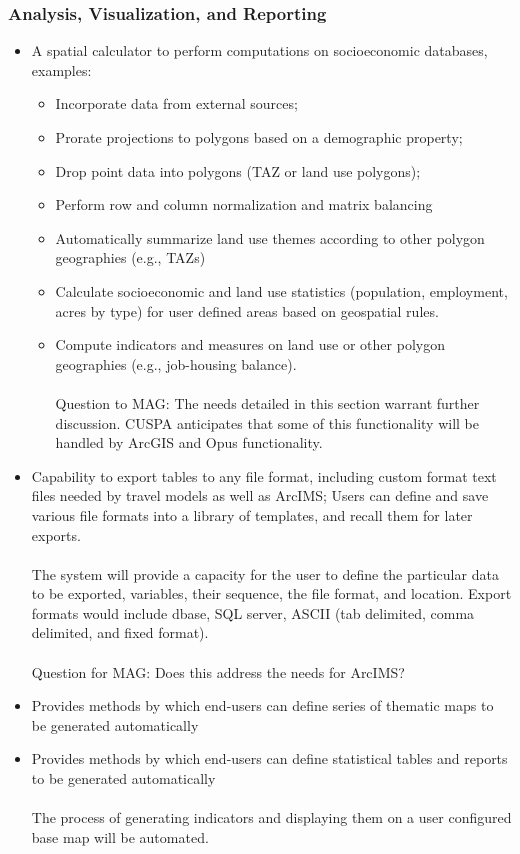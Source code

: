 \documentclass[titlepage]{article}
\begin{document}
\subsubsection{Analysis, Visualization, and Reporting}
\begin{itemize}
	\item A spatial calculator to perform computations on socioeconomic databases, examples:
		\begin{itemize}
			\item Incorporate data from external sources;
			\item Prorate projections to polygons based on a demographic property;
			\item Drop point data into polygons (TAZ or land use polygons);
			\item Perform row and column normalization and matrix balancing
			\item Automatically summarize land use themes according to other polygon geographies (e.g., TAZs)
			\item Calculate socioeconomic and land use statistics (population, employment, acres by type) for user defined areas based on geospatial rules.
			\item Compute indicators and measures on land use or other polygon geographies (e.g., job-housing balance).
			\\\\
			Question to MAG: The needs detailed in this section warrant further discussion.  CUSPA anticipates that some of this functionality will be handled by ArcGIS and Opus functionality.
		\end{itemize}
	\item Capability to export tables to any file format, including custom format text files needed by travel models as well as ArcIMS; Users can define and save various file formats into a library of templates, and recall them for later exports.
	\\\\
	The system will provide a capacity for the user to define the particular data to be exported, variables, their sequence, the file format, and location.  Export formats would include dbase, SQL server, ASCII (tab delimited, comma delimited, and fixed format).
	\\\\
	Question for MAG: Does this address the needs for ArcIMS?
	\item Provides methods by which end-users can define series of thematic maps to be generated automatically
	\item Provides methods by which end-users can define statistical tables and reports to be generated automatically
	\\\\
	The process of generating indicators and displaying them on a user configured base map will be automated.
\end{itemize}
\end{document}
